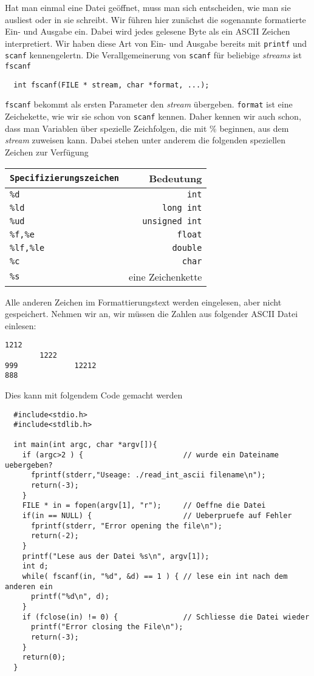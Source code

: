 Hat man einmal eine Datei geöffnet, muss man sich entscheiden, wie man sie ausliest oder in sie schreibt.
Wir führen hier zunächst die sogenannte formatierte Ein- und Ausgabe ein.
Dabei wird jedes gelesene Byte als ein ASCII Zeichen interpretiert.
Wir haben diese Art von Ein- und Ausgabe bereits mit \verb|printf| und \verb|scanf| kennengelertn.
Die Verallgemeinerung von \verb|scanf| für beliebige \emph{streams} ist \verb|fscanf|
\begin{lstlisting}
  int fscanf(FILE * stream, char *format, ...);
\end{lstlisting}
\verb|fscanf| bekommt als ersten Parameter den \emph{stream} übergeben.
\verb|format| ist eine Zeichekette, wie wir sie schon von \verb|scanf| kennen.
Daher kennen wir auch schon, dass man Variablen über spezielle Zeichfolgen, die mit \% beginnen, aus dem \emph{stream} zuweisen kann.
Dabei stehen unter anderem die folgenden speziellen Zeichen zur Verfügung
\begin{center}
  \begin{tabular}{lr}
    \hline
    \texttt{Specifizierungszeichen} & Bedeutung \\\hline
    \texttt{\%d}	&  \texttt{int} \\
    \texttt{\%ld}  &  \texttt{long int} \\
    \texttt{\%ud}  &  \texttt{unsigned int} \\
    \texttt{\%f,\%e}   & \texttt{float} \\
    \texttt{\%lf,\%le}  & \texttt{double} \\
    \texttt{\%c}  & \texttt{char} \\
    \texttt{\%s}  & eine Zeichenkette\\
    \hline
  \end{tabular}
\end{center}
Alle anderen Zeichen im Formattierungstext werden eingelesen, aber nicht gespeichert. 
Nehmen wir an, wir müssen die Zahlen aus folgender ASCII Datei einlesen:
\begin{lstlisting}
1212
        1222
999             12212
888
\end{lstlisting}
Dies kann mit folgendem Code gemacht werden
\begin{lstlisting}
  #include<stdio.h>
  #include<stdlib.h>

  int main(int argc, char *argv[]){
    if (argc>2 ) {                       // wurde ein Dateiname uebergeben?
      fprintf(stderr,"Useage: ./read_int_ascii filename\n");
      return(-3);
    }
    FILE * in = fopen(argv[1], "r");     // Oeffne die Datei
    if(in == NULL) {                     // Ueberpruefe auf Fehler 
      fprintf(stderr, "Error opening the file\n");
      return(-2);
    }
    printf("Lese aus der Datei %s\n", argv[1]);
    int d;
    while( fscanf(in, "%d", &d) == 1 ) { // lese ein int nach dem anderen ein
      printf("%d\n", d);
    }
    if (fclose(in) != 0) {               // Schliesse die Datei wieder
      printf("Error closing the File\n");
      return(-3);
    }
    return(0);
  }
\end{lstlisting}

